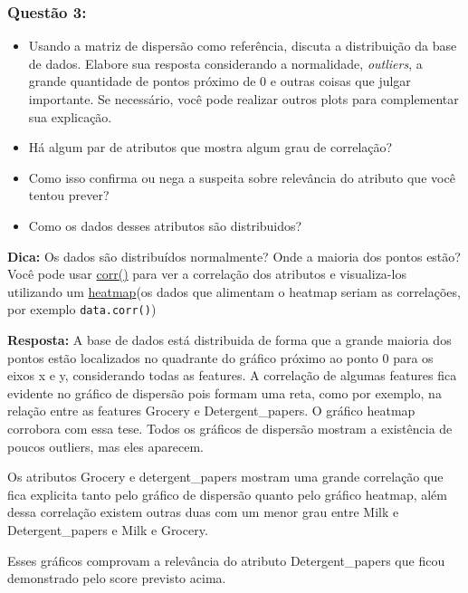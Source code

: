 \documentclass[11pt]{article}
\providecommand{\tightlist}{%
      \setlength{\itemsep}{0pt}\setlength{\parskip}{0pt}}
\begin{document}
    \subsubsection{Questão 3:}\label{questuxe3o-3}

\begin{itemize}
\tightlist
\item
  Usando a matriz de dispersão como referência, discuta a distribuição
  da base de dados. Elabore sua resposta considerando a normalidade,
  \emph{outliers}, a grande quantidade de pontos próximo de 0 e outras
  coisas que julgar importante. Se necessário, você pode realizar outros
  plots para complementar sua explicação.
\item
  Há algum par de atributos que mostra algum grau de correlação?
\item
  Como isso confirma ou nega a suspeita sobre relevância do atributo que
  você tentou prever?
\item
  Como os dados desses atributos são distribuidos?
\end{itemize}

\textbf{Dica:} Os dados são distribuídos normalmente? Onde a maioria dos
pontos estão? Você pode usar
\href{https://pandas.pydata.org/pandas-docs/stable/generated/pandas.DataFrame.corr.html}{corr()}
para ver a correlação dos atributos e visualiza-los utilizando um
\href{http://seaborn.pydata.org/generated/seaborn.heatmap.html}{heatmap}(os
dados que alimentam o heatmap seriam as correlações, por exemplo
\texttt{data.corr()})

    \textbf{Resposta:} A base de dados está distribuida de forma que a
grande maioria dos pontos estão localizados no quadrante do gráfico
próximo ao ponto 0 para os eixos x e y, considerando todas as features.
A correlação de algumas features fica evidente no gráfico de dispersão
pois formam uma reta, como por exemplo, na relação entre as features
Grocery e Detergent\_papers. O gráfico heatmap corrobora com essa tese.
Todos os gráficos de dispersão mostram a existência de poucos outliers,
mas eles aparecem.

Os atributos Grocery e detergent\_papers mostram uma grande correlação
que fica explicita tanto pelo gráfico de dispersão quanto pelo gráfico
heatmap, além dessa correlação existem outras duas com um menor grau
entre Milk e Detergent\_papers e Milk e Grocery.

Esses gráficos comprovam a relevância do atributo Detergent\_papers que
ficou demonstrado pelo score previsto acima.
\end{document}

